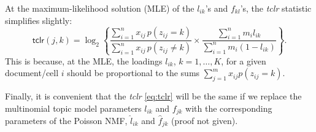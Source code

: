 \documentclass[final]{siamart171218}
\begin{document}
At the maximum-likelihood solution (MLE) of the $l_{ik}$'s and $f_{kl}$'s,
the {\em tclr} statistic simplifies slightly:
\begin{equation}
\mathsf{tclr}(j,k) = \log_2 \left\{ \frac{\sum_{i=1}^n x_{ij} \, p(z_{ij} = k)}
                       {\sum_{i=1}^n x_{ij} \, p(z_{ij} \neq k)} \times
                  \frac{\sum_{i=1}^n m_i l_{ik}}
                       {\sum_{i=1}^n m_i (1 - l_{ik})}
                  \right\}.
\end{equation}
This is because, at the MLE, the loadings $l_{ik}$, $k = 1, \ldots,
K$, for a given document/cell $i$ should be proportional to the sums
$\sum_{j=1}^m x_{ij} p(z_{ij} = k)$.

Finally, it is convenient that the {\em tclr} \eqref{eq:tclr} will be
the same if we replace the multinomial topic model parameters $l_{ik}$
and $f_{jk}$ with the corresponding parameters of the Poisson NMF,
$\hat{l}_{ik}$ and $\hat{f}_{jk}$ (proof not given).



\end{document}
